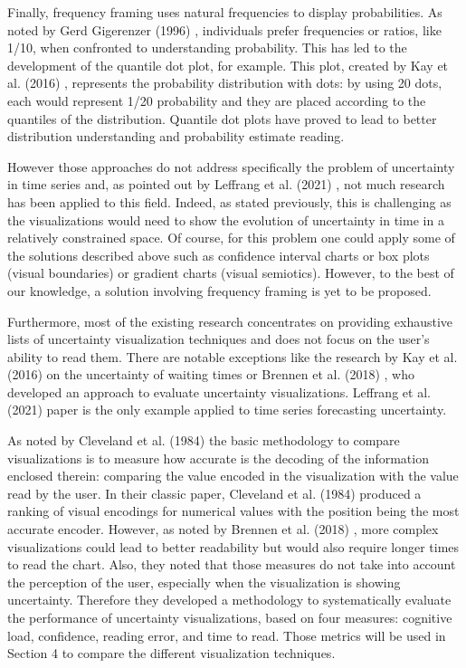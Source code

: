 \documentclass[a4paper,3p,sort&compress]{elsarticle}
\begin{document}
Finally, frequency framing uses natural frequencies to display probabilities. As
noted by Gerd Gigerenzer (1996) \cite{gigerenzer_psychology_1996}, individuals prefer frequencies
or ratios, like 1/10, when confronted to understanding probability. This has led
to the development of the quantile dot plot, for example. This plot, created by
Kay et al. (2016) \cite{2016-when-ish-is-my-bus}, represents the probability
distribution with dots: by using 20 dots, each would represent 1/20 probability
and they are placed according to the quantiles of the distribution. Quantile dot
plots have proved to lead to better distribution understanding and probability
estimate reading.

However those approaches do not address specifically the problem of uncertainty
in time series and, as pointed out by Leffrang et al. (2021)
\cite{leffrang_should_2021}, not much research has been applied to this field.
Indeed, as stated previously, this is challenging as the visualizations would
need to show the evolution of uncertainty in time in a relatively constrained
space. Of course, for this problem one could apply some of the solutions
described above such as confidence interval charts or box plots (visual
boundaries) or gradient charts (visual semiotics). However, to the best of our
knowledge, a solution involving frequency framing is yet to be proposed.

Furthermore, most of the existing research concentrates on providing exhaustive
lists of uncertainty visualization techniques and does not focus on the user's
ability to read them. There are notable exceptions like the research by Kay et
al. (2016) \cite{2016-when-ish-is-my-bus} on the uncertainty of waiting times or
Brennen et al. (2018) \cite{brennen_instrument_2018}, who developed an approach to
evaluate uncertainty visualizations. Leffrang et al. (2021) \cite{leffrang_should_2021}
paper is the only example applied to time series forecasting uncertainty.

As noted by Cleveland et al. (1984) \cite{cleveland_graphical_1984} the basic
methodology to compare visualizations is to measure how accurate is the decoding
of the information enclosed therein: comparing the value encoded in the
visualization with the value read by the user. In their classic paper, Cleveland
et al. (1984)\cite{cleveland_graphical_1984} produced a ranking of visual encodings
for numerical values with the position being the most accurate encoder. However,
as noted by Brennen et al. (2018) \cite{brennen_instrument_2018}, more complex
visualizations could lead to better readability but would also require longer
times to read the chart. Also, they noted that those measures do not take into
account the perception of the user, especially when the visualization is showing
uncertainty. Therefore they developed a methodology to systematically evaluate
the performance of uncertainty visualizations, based on four measures: cognitive
load, confidence, reading error, and time to read. Those metrics will be used in
Section 4 to compare the different visualization techniques.
\end{document}

